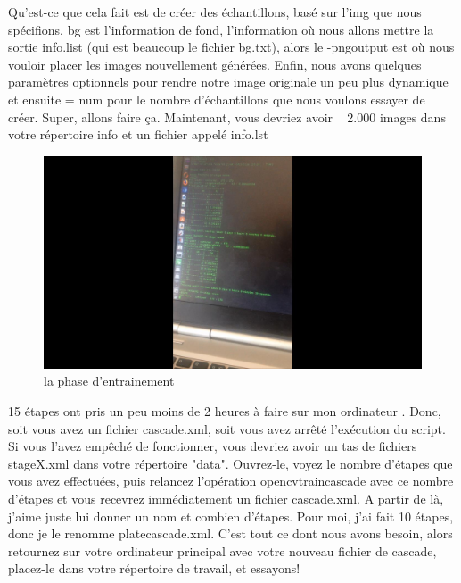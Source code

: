 \documentclass[11pt]{report}
\begin{document}
Qu'est-ce que cela fait est de créer des échantillons, basé sur l'img que nous spécifions,
bg est l'information de fond, l'information où nous allons mettre la sortie info.list (qui est
beaucoup le fichier bg.txt), alors le -pngoutput est où nous vouloir placer les images
nouvellement générées. Enfin, nous avons quelques paramètres optionnels pour rendre
notre image originale un peu plus dynamique et ensuite = num pour le nombre
d’échantillons que nous voulons essayer de créer. Super, allons faire ça. Maintenant, vous
devriez avoir ~ 2.000 images dans votre répertoire info et un fichier appelé info.lst

\begin{figure}[H]
	\begin{center}
		\includegraphics[width=12cm]{images/training.png}
		\caption{la phase d'entrainement}
		\label{fig:figure}
	\end{center}
\end{figure}

15 étapes ont pris un peu moins de 2 heures à faire sur mon ordinateur . Donc, soit vous
avez un fichier cascade.xml, soit vous avez arrêté l'exécution du script. Si vous l'avez
empêché de fonctionner, vous devriez avoir un tas de fichiers stageX.xml dans votre
répertoire "data". Ouvrez-le, voyez le nombre d'étapes que vous avez effectuées, puis
relancez l'opération opencvtraincascade avec ce nombre d'étapes et vous recevrez
immédiatement un fichier cascade.xml. A partir de là, j'aime juste lui donner un nom et
combien
d'étapes. Pour
moi,
j'ai
fait
10
étapes,
donc
je
le
renomme platecascade.xml. C'est tout ce dont nous avons besoin, alors retournez sur
votre ordinateur principal avec votre nouveau fichier de cascade, placez-le dans votre
répertoire de travail, et essayons!
\end{document}
